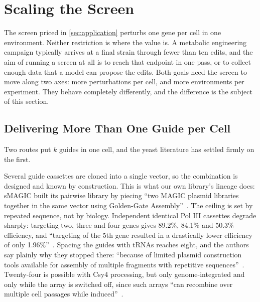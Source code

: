 
\section{Scaling the Screen}
\label{sec:scaling}

The screen priced in \cref{sec:application} perturbs one gene per cell in one
environment. Neither restriction is where the value is. A metabolic engineering
campaign typically arrives at a final strain through fewer than ten edits, and
the aim of running a screen at all is to reach that endpoint in one pass, or to
collect enough data that a model can propose the edits. Both goals need the
screen to move along two axes: more perturbations per cell, and more environments
per experiment. They behave completely differently, and the difference is the
subject of this section.

\subsection{Delivering More Than One Guide per Cell}
\label{sec:delivery}

Two routes put $k$ guides in one cell, and the yeast literature has settled
firmly on the first.

 Several guide cassettes are cloned
into a single vector, so the combination is designed and known by construction.
This is what our own library's lineage does: sMAGIC built its pairwise library by
piecing ``two MAGIC plasmid libraries together in the same vector using
Golden-Gate Assembly''~\citep{lianMultifunctionalGenomewideCRISPR2019}. The
ceiling is set by repeated sequence, not by biology. Independent identical Pol
III cassettes degrade sharply: targeting two, three and four genes gives
89.2\%, 84.1\% and 50.3\% efficiency, and ``targeting of the 5th gene resulted in
a drastically lower efficiency of only
1.96\%''~\citep{zunConstructionEvaluationGRNA2023}. Spacing the guides
with tRNAs reaches eight, and the authors say plainly why they stopped there:
``because of limited plasmid construction tools available for assembly of
multiple fragments with repetitive
sequences''~\citep{zhangGRNAtRNAArrayCRISPRCas92019}. Twenty-four is possible with
Csy4 processing, but only genome-integrated and only while the array is switched
off, since such arrays ``can recombine over multiple cell passages while
induced''~\citep{shawInducibleExpressionLarge2022}.

